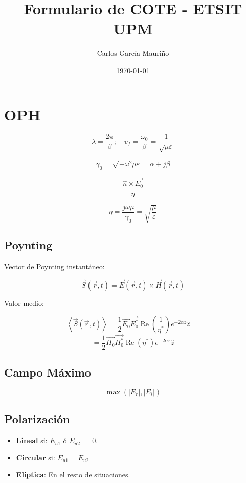 \documentclass[12pt,a4paper]{article}
\title{Formulario de COTE - ETSIT UPM}
\author{Carlos García-Mauriño}
\date{\today}
\begin{document}
\maketitle

\twocolumn

\section{OPH}
\label{sec:ondas_planas_homogeneas}

\[ \lambda = \frac{2 \pi}{\beta}; \quad v_f = \frac{\omega_0}{\beta}  =
\frac{1}{\sqrt{\mu \varepsilon}} \]

\[ \gamma_0 = \sqrt{-\omega^2 \mu \varepsilon} = \alpha + j \beta \]

\[ \frac{\hat{n} \times \vec{E_0}}{\eta} \]

\[ \eta = \frac{j \omega \mu}{\gamma_0} = \sqrt{\frac{\mu}{\varepsilon}} \]

\subsection{Poynting}
\label{sub:poynting}

Vector de Poynting instantáneo:

\[ \vec{S} ( \vec{r}, t ) = \vec{E} ( \vec{r}, t ) \times \vec{H} ( \vec{r}, t
) \]

Valor medio:

\[ \left< \vec{S} ( \vec{r}, t ) \right> = \frac{1}{2} \vec{E_0} \vec{E_0^*}
\operatorname{Re}\left( \frac{1}{\eta^*} \right) e^{-2 \alpha z} \hat{z} = \]
\[ = \frac{1}{2} \vec{H_0} \vec{H_0^*} \operatorname{Re}\left( \eta^* \right) e^{-2 \alpha z} \hat{z} \]

\subsection{Campo Máximo}
\label{sub:campo_maximo}

\[ \max{\left(|E_r|, |E_i|\right)} \]

\subsection{Polarización}
\label{sub:polarizacion}

\begin{itemize}
		\item \textbf{Lineal} si:
				$ E_{u1} $ ó $ E_{u2} \, = \, 0$.
		\item \textbf{Circular} si:
				$ E_{u1} = E_{u2} $ 
		\item \textbf{Elíptica}:
				En el resto de situaciones.
\end{itemize}
\end{document}
